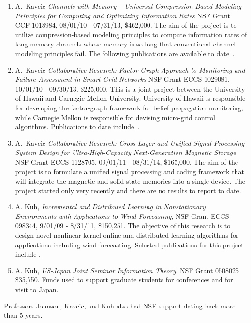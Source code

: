 \begin{enumerate}
\item A.~Kavcic {\em Channels with Memory -- Universal-Compression-Based
    Modeling Principles for Computing and Optimizing Information Rates}
  NSF Grant CCF-1018984, 08/01/10 - 07/31/13, \$462,000. The aim of
  the project is to utilize compression-based modeling principles
  to compute information rates of long-memory channels whose memory
  is so long that conventional channel modeling principles fail. The
  following publications are available to
  date~\cite{Lim11,Yuan11,JS1,JS2,JS3,JS4}.

\item A.~Kavcic {\em Collaborative Research: Factor-Graph Approach to
    Monitoring and Failure Assessment in Smart-Grid Networks}
  NSF Grant ECCS-1029081, 10/01/10 - 09/30/13, \$225,000.
  This is a joint project between the University of Hawaii and
  Carnegie Mellon University. University of Hawaii is responsible
  for developing the factor-graph framework for belief propagation
  monitoring, while Carnegie Mellon is responsible for devising
  micro-grid control algorithms. Publications to date
  include~\cite{Hu10,Hu11,Hu11a}.

\item A.~Kavcic {\em Collaborative Research: Cross-Layer and Unified
    Signal Processing System Design for
    Ultra-High-Capacity Next-Generation Magnetic Storage}
  NSF Grant ECCS-1128705, 09/01/11 - 08/31/14, \$165,000.
  The aim of the project is to formulate a unified signal processing
  and coding framework that will integrate the magnetic and solid
  state memories into a single device. The project
  started only very recently and there are no results to report
  to date.

\item A. Kuh, {\em Incremental and Distributed Learning in Nonstationary
    Environments with Applications to Wind Forecasting}, NSF Grant ECCS-098344,
  9/01/09 - 8/31/11, \$150,251.  The objective of this research is to
  design novel nonlinear kernel online and distributed learning algorithms
  for applications including wind forecasting.  Selected publications for
  this project include \cite{kuhetal-10icgc,kowahl-kuh-10ijcnn}.

\item A. Kuh, {\em US-Japan Joint Seminar Information Theory}, NSF Grant 0508025
  \$35,750.  Funds used to support graduate students for conferences and
  for visit to Japan.
\end{enumerate}

Professors Johnson, Kavcic, and Kuh also had NSF support dating back more than 5 years.
